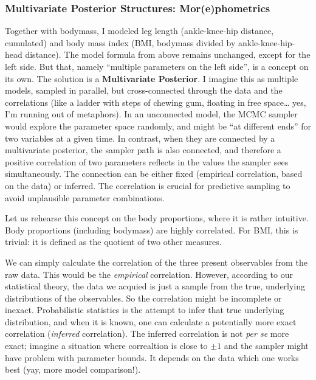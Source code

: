\subsubsection{Multivariate Posterior Structures: Mor(e)phometrics}
\label{sec:orgf2c37c2}
Together with bodymass, I modeled leg length (ankle-knee-hip distance, cumulated) and body mass index (BMI, bodymass divided by ankle-knee-hip-head distance).
The model formula from above remains unchanged, except for the left side.
But that, namely ``multiple parameters on the left side'', is a concept on its own.
The solution is a \textbf{Multivariate Posterior}.
I imagine this as multiple models, sampled in parallel, but cross-connected through the data and the correlations (like a ladder with steps of chewing gum, floating in free space\ldots{} yes, I'm running out of metaphors).
In an unconnected model, the MCMC sampler would explore the parameter space randomly, and might be ``at different ends'' for two variables at a given time.
In contrast, when they are connected by a multivariate posterior, the sampler path is also connected, and therefore a positive correlation of two parameters reflects in the values the sampler sees simultaneously.
The connection can be either fixed (empirical correlation, based on the data) or inferred.
The correlation is crucial for predictive sampling to avoid unplausible parameter combinations.


Let us rehearse this concept on the body proportions, where it is rather intuitive.
Body proportions (including bodymass) are highly correlated.
For BMI, this is trivial: it is defined as the quotient of two other measures.

We can simply calculate the correlation of the three present observables from the raw data.
This would be the \emph{empirical} correlation.
However, according to our statistical theory, the data we acquied is just a sample from the true, underlying distributions of the observables.
So the correlation might be incomplete or inexact.
Probabilistic statistics is the attempt to infer that true underlying distribution, and when it is known, one can calculate a potentially more exact correlation (\emph{inferred} correlation).
The inferred correlation is not \emph{per se} more exact; imagine a situation where correaltion is close to \(\pm 1\) and the sampler might have problem with parameter bounds.
It depends on the data which one works best (yay, more model comparison!).


